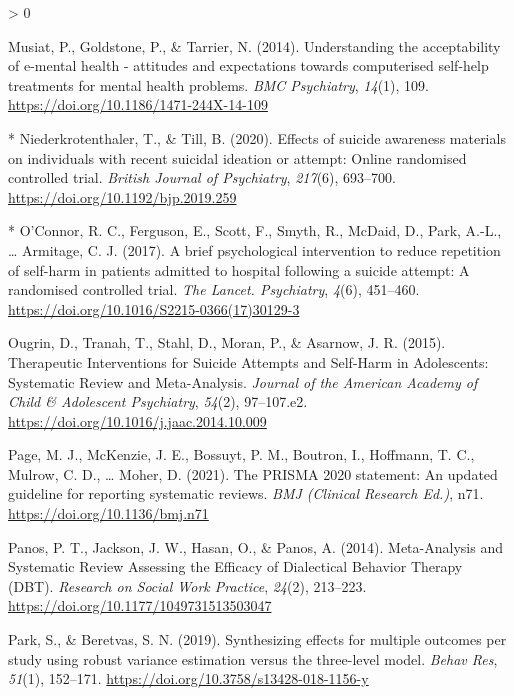 \documentclass[
  english,
  man]{apa6}
\newlength{\cslhangindent}
\newenvironment{CSLReferences}[2] %
 {%
  \setlength{\parindent}{0pt}
  \ifodd #1 \everypar{\setlength{\hangindent}{\cslhangindent}}\ignorespaces\fi
  \ifnum #2 > 0
  \setlength{\parskip}{#2\baselineskip}
  \fi
 }%
 {}
\begin{document}
\begin{CSLReferences}{1}{0}
\leavevmode\hypertarget{ref-musiat2014}{}%
Musiat, P., Goldstone, P., \& Tarrier, N. (2014). Understanding the acceptability of e-mental health - attitudes and expectations towards computerised self-help treatments for mental health problems. \emph{BMC Psychiatry}, \emph{14}(1), 109. \url{https://doi.org/10.1186/1471-244X-14-109}

\leavevmode\hypertarget{ref-niederkrotenthaler2020}{}%
* Niederkrotenthaler, T., \& Till, B. (2020). Effects of suicide awareness materials on individuals with recent suicidal ideation or attempt: {Online} randomised controlled trial. \emph{British Journal of Psychiatry}, \emph{217}(6), 693--700. \url{https://doi.org/10.1192/bjp.2019.259}

\leavevmode\hypertarget{ref-oconnor2017}{}%
* O'Connor, R. C., Ferguson, E., Scott, F., Smyth, R., McDaid, D., Park, A.-L., \ldots{} Armitage, C. J. (2017). A brief psychological intervention to reduce repetition of self-harm in patients admitted to hospital following a suicide attempt: {A} randomised controlled trial. \emph{The Lancet. Psychiatry}, \emph{4}(6), 451--460. \url{https://doi.org/10.1016/S2215-0366(17)30129-3}

\leavevmode\hypertarget{ref-ougrin2015}{}%
Ougrin, D., Tranah, T., Stahl, D., Moran, P., \& Asarnow, J. R. (2015). Therapeutic {Interventions} for {Suicide Attempts} and {Self-Harm} in {Adolescents}: {Systematic Review} and {Meta-Analysis}. \emph{Journal of the American Academy of Child \& Adolescent Psychiatry}, \emph{54}(2), 97--107.e2. \url{https://doi.org/10.1016/j.jaac.2014.10.009}

\leavevmode\hypertarget{ref-page2021}{}%
Page, M. J., McKenzie, J. E., Bossuyt, P. M., Boutron, I., Hoffmann, T. C., Mulrow, C. D., \ldots{} Moher, D. (2021). The {PRISMA} 2020 statement: {An} updated guideline for reporting systematic reviews. \emph{BMJ (Clinical Research Ed.)}, n71. \url{https://doi.org/10.1136/bmj.n71}

\leavevmode\hypertarget{ref-panos2014}{}%
Panos, P. T., Jackson, J. W., Hasan, O., \& Panos, A. (2014). Meta-{Analysis} and {Systematic Review Assessing} the {Efficacy} of {Dialectical Behavior Therapy} ({DBT}). \emph{Research on Social Work Practice}, \emph{24}(2), 213--223. \url{https://doi.org/10.1177/1049731513503047}

\leavevmode\hypertarget{ref-park2019}{}%
Park, S., \& Beretvas, S. N. (2019). Synthesizing effects for multiple outcomes per study using robust variance estimation versus the three-level model. \emph{Behav Res}, \emph{51}(1), 152--171. \url{https://doi.org/10.3758/s13428-018-1156-y}


\end{CSLReferences}
\end{document}
